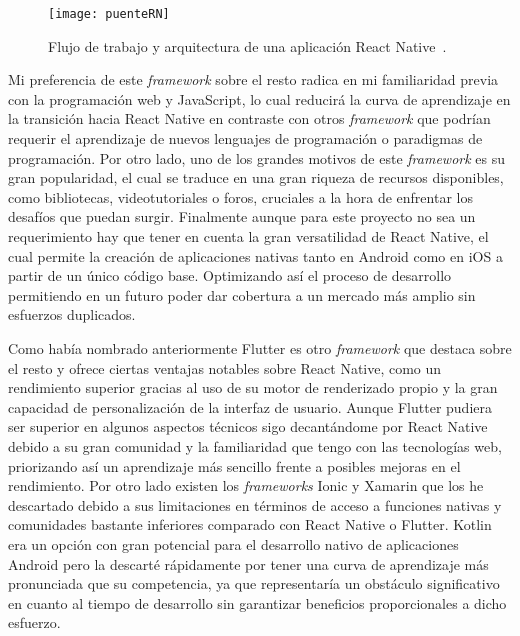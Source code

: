 \begin{figure}[h]
	\label{img:puenteRN}
	\centering
	\texttt{[image: puenteRN]}
	\caption[flujo trabajo React Native]{Flujo de trabajo y arquitectura de una aplicación React Native~\cite{RNarquitectura}.}
\end{figure}

Mi preferencia de este \textit{framework} sobre el resto radica en mi familiaridad previa con la programación web y JavaScript, lo cual reducirá la curva de aprendizaje en la transición hacia React Native en contraste con otros \textit{framework} que podrían requerir el aprendizaje de nuevos lenguajes de programación o paradigmas de programación. 
Por otro lado, uno de los grandes motivos de este \textit{framework} es su gran popularidad, el cual se traduce en una gran riqueza de recursos disponibles, como bibliotecas, videotutoriales o foros, cruciales a la hora de enfrentar los desafíos que puedan surgir. 
Finalmente aunque para este proyecto no sea un requerimiento hay que tener en cuenta la gran versatilidad de React Native, el cual permite la creación de aplicaciones nativas tanto en Android como en iOS a partir de un único código base. Optimizando así el proceso de desarrollo permitiendo en un futuro poder dar cobertura a un mercado más amplio sin esfuerzos duplicados.

Como había nombrado anteriormente Flutter es otro \textit{framework} que destaca sobre el resto y ofrece ciertas ventajas notables sobre React Native, como un rendimiento superior gracias al uso de su motor de renderizado propio y la gran capacidad de personalización de la interfaz de usuario. Aunque Flutter pudiera ser superior en algunos aspectos técnicos sigo decantándome por React Native debido a su gran comunidad y la familiaridad que tengo con las tecnologías web, priorizando así un aprendizaje más sencillo frente a posibles mejoras en el rendimiento. Por otro lado existen los \textit{frameworks} Ionic y Xamarin que los he descartado debido a sus limitaciones en términos de acceso a funciones nativas y comunidades bastante inferiores comparado con React Native o Flutter. Kotlin era un opción con gran potencial para el desarrollo nativo de aplicaciones Android pero la descarté rápidamente por tener una curva de aprendizaje más pronunciada que su competencia, ya que representaría un obstáculo significativo en cuanto al tiempo de desarrollo sin garantizar beneficios proporcionales a dicho esfuerzo.

